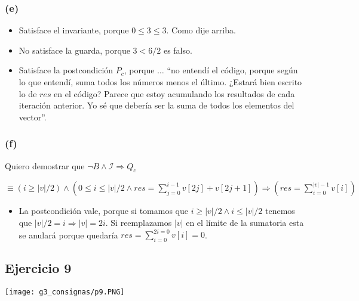 \documentclass[12 pt]{article}
\begin{document}
    \subsubsection*{(e)}
        \begin{itemize}
            \item Satisface el invariante, porque $0 \leq 3 \leq 3$. Como dije arriba.
            \item No satisface la guarda, porque $3 < 6/2$ es falso.
            \item Satisface la postcondición $P_{c}$, porque $\ldots$ ``no entendí el código, porque según lo que entendí, suma todos los números menos el último. ¿Estará bien escrito lo de $res$ en el código? Parece que estoy acumulando los resultados de cada iteración anterior. Yo sé que debería ser la suma de todos los elementos del vector''.
        \end{itemize}
    \subsubsection*{(f)}
        Quiero demostrar que $\neg B \wedge \mathcal{I} \Rightarrow Q_{c}$
        
        $\equiv \left(i \geq |v|/2\right) \wedge \left(0 \leq i \leq |v|/2 \wedge res = \sum^{i-1}_{j=0}v[2j]+v[2j+1]\right) \Rightarrow \left(res = \sum^{|v|-1}_{i=0}v[i]\right)$

        \begin{itemize}
            \item La postcondición vale, porque si tomamos que $i \geq |v|/2 \wedge i \leq |v|/2$ tenemos que $|v|/2 = i \Rightarrow |v| = 2i$. Si reemplazamos $|v|$ en el límite de la sumatoria esta se anulará porque quedaría $res = \sum^{2i = 0}_{i=0}v[i] = 0$.
        \end{itemize}
        
\subsection*{Ejercicio 9}
     \begin{center}
         \texttt{[image: g3\_consignas/p9.PNG]}
     \end{center}
\end{document}
